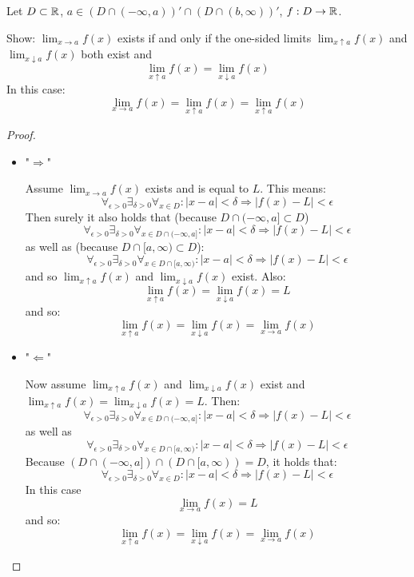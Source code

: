 \documentclass[week=6]{homework}
\begin{document}
\begin{questions}
        \question
        Let $D \subset \mathbb{R}$, $a \in (D \cap (-\infty,a))' \cap (D \cap (b,\infty))'$, $f : D \to \mathbb{R}$. 
        
        Show: $\lim_{x \to a} f(x)$ exists if and only if the one-sided limits $\lim_{x \uparrow a} f(x)$ and $\lim_{x \downarrow a} f(x)$ both exist and 
        \[
	        \lim_{x \uparrow a} f(x) = \lim_{x \downarrow a} f(x)
        \]
        In this case:
        \[
	        \lim_{x \to a} f(x) = \lim_{x \uparrow a} f(x) = \lim_{x \uparrow a} f(x)
        \]
        \begin{proof}
	        
	        \begin{itemize}
	        	\item "$\Rightarrow$"
	        	
	        	Assume $\lim_{x \to a} f(x)$ exists and is equal to $L$. This means:
	        	\[
		        	\forall_{\epsilon > 0} \exists_{\delta > 0} \forall_{x \in D} : |x - a| < \delta \Rightarrow |f(x) - L| < \epsilon
	        	\]
	        	Then surely it also holds that (because $D \cap (-\infty, a] \subset D$)
	        	\[
		        	\forall_{\epsilon > 0} \exists_{\delta > 0} \forall_{x \in D \cap (-\infty, a]} : |x - a| < \delta \Rightarrow |f(x) - L| < \epsilon
	        	\]
	        	as well as (because $D \cap [a, \infty) \subset D$): 
	        	\[
		        	\forall_{\epsilon > 0} \exists_{\delta > 0} \forall_{x \in D \cap [a, \infty)} : |x - a| < \delta \Rightarrow |f(x) - L| < \epsilon
	        	\]
	        	and so $\lim_{x \uparrow a} f(x)$ and $\lim_{x \downarrow a} f(x)$ exist. Also:
	        	\[
		        	\lim_{x \uparrow a} f(x) = \lim_{x \downarrow a} f(x) = L
	        	\]
	        	and so:
	        	\[
		        	\lim_{x \uparrow a} f(x) = \lim_{x \downarrow a} f(x) = \lim_{x \to a} f(x)
	        	\]
	        	
	        	\item "$\Leftarrow$"
	        	
	        	Now assume $\lim_{x \uparrow a} f(x)$ and $\lim_{x \downarrow a} f(x)$ exist and $\lim_{x \uparrow a} f(x) = \lim_{x \downarrow a} f(x) = L$. Then:
	        	\[
		        	\forall_{\epsilon > 0} \exists_{\delta > 0} \forall_{x \in D \cap (-\infty, a]} : |x - a| < \delta \Rightarrow |f(x) - L| < \epsilon
	        	\]
	        	as well as
	        	\[
		        	\forall_{\epsilon > 0} \exists_{\delta > 0} \forall_{x \in D \cap [a, \infty)} : |x - a| < \delta \Rightarrow |f(x) - L| < \epsilon
	        	\]
	        	Because $(D \cap (-\infty, a]) \cap (D \cap [a, \infty)) = D$, it holds that:
	        	\[
		        	\forall_{\epsilon > 0} \exists_{\delta > 0} \forall_{x \in D} : |x - a| < \delta \Rightarrow |f(x) - L| < \epsilon
		        \]
		        In this case
		        \[
						\lim_{x \to a} f(x) = L	        
		        \]
		        and so:
		        \[
			        \lim_{x \uparrow a} f(x) = \lim_{x \downarrow a} f(x) = \lim_{x \to a} f(x)
		        \]
	        	

\end{itemize}
\end{proof}
\end{questions}
\end{document}
